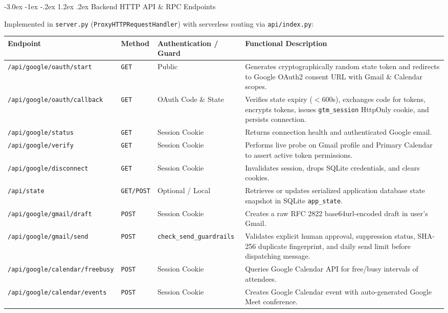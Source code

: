 \documentclass[10pt,letterpaper]{article}
\makeatletter
\renewcommand{\section}{\@startsection{section}{1}{\z@}%
  {-3.0ex \@plus -1ex \@minus -.2ex}%
  {1.2ex \@plus .2ex}%
  {\normalfont\large\bfseries\color{branddark}}}
\makeatother
\begin{document}
\section{Backend HTTP API \& RPC Endpoints}

Implemented in \texttt{server.py} (\texttt{ProxyHTTPRequestHandler}) with serverless routing via \texttt{api/index.py}:

\begin{table}[h!]
\centering
\scriptsize
\begin{tabularx}{\textwidth}{l l p{3.2cm} X}
\toprule
\textbf{Endpoint} & \textbf{Method} & \textbf{Authentication / Guard} & \textbf{Functional Description} \\
\midrule
\texttt{/api/google/oauth/start} & \texttt{GET} & Public & Generates cryptographically random state token and redirects to Google OAuth2 consent URL with Gmail \& Calendar scopes. \\
\texttt{/api/google/oauth/callback} & \texttt{GET} & OAuth Code \& State & Verifies state expiry ($<600$s), exchanges code for tokens, encrypts tokens, issues \texttt{gtm\_session} HttpOnly cookie, and persists connection. \\
\texttt{/api/google/status} & \texttt{GET} & Session Cookie & Returns connection health and authenticated Google email. \\
\texttt{/api/google/verify} & \texttt{GET} & Session Cookie & Performs live probe on Gmail profile and Primary Calendar to assert active token permissions. \\
\texttt{/api/google/disconnect} & \texttt{GET} & Session Cookie & Invalidates session, drops SQLite credentials, and clears cookies. \\
\texttt{/api/state} & \texttt{GET/POST} & Optional / Local & Retrieves or updates serialized application database state snapshot in SQLite \texttt{app\_state}. \\
\texttt{/api/google/gmail/draft} & \texttt{POST} & Session Cookie & Creates a raw RFC 2822 base64url-encoded draft in user's Gmail. \\
\texttt{/api/google/gmail/send} & \texttt{POST} & \texttt{check\_send\_guardrails} & Validates explicit human approval, suppression status, SHA-256 duplicate fingerprint, and daily send limit before dispatching message. \\
\texttt{/api/google/calendar/freebusy} & \texttt{POST} & Session Cookie & Queries Google Calendar API for free/busy intervals of attendees. \\
\texttt{/api/google/calendar/events} & \texttt{POST} & Session Cookie & Creates Google Calendar event with auto-generated Google Meet conference. \\

\end{tabularx}
\end{table}
\end{document}
